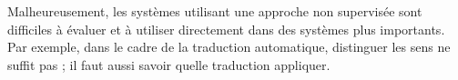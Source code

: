 Malheureusement, les systèmes utilisant une approche non supervisée sont
difficiles à évaluer et à utiliser directement dans des systèmes plus
importants. Par exemple, dans le cadre de la traduction automatique, distinguer
les sens ne suffit pas ; il faut aussi savoir quelle traduction appliquer.

%
%
%
%
%
%
